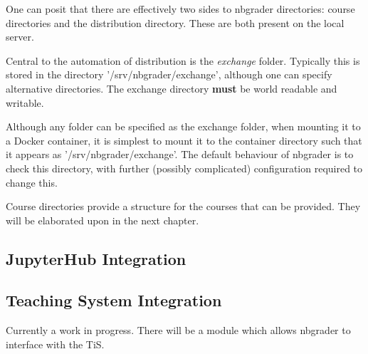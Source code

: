    One can posit that there are effectively two sides to nbgrader directories: course directories and the distribution directory. These are both present on the local server.
   
   Central to the automation of distribution is the \textit{exchange} folder. Typically this is stored in the directory '/srv/nbgrader/exchange', although one can specify alternative directories. The exchange directory \textbf{must} be world readable and writable.
   
   Although any folder can be specified as the exchange folder, when mounting it to a Docker container, it is simplest to mount it to the container directory such that it appears as '/srv/nbgrader/exchange'. The default behaviour of nbgrader is to check this directory, with further (possibly complicated) configuration required to change this.
   
   Course directories provide a structure for the courses that can be provided. They will be elaborated upon in the next chapter.
   
   \subsection{JupyterHub Integration}
   
   \subsection{Teaching System Integration}
   
   Currently a work in progress. There will be a module which allows nbgrader to interface with the TiS.